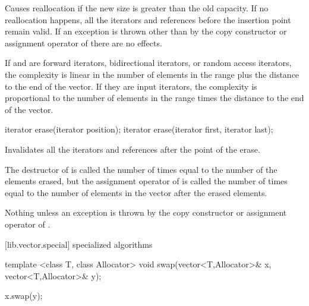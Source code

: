 \begin{itemdescr}
\pnum
\notes
Causes reallocation if the new size is greater than the old capacity.
If no reallocation happens, all the iterators and references before the insertion point remain valid.
If an exception is thrown other than by
the copy constructor or assignment operator of
 there are no effects.

\pnum
\complexity
If  and  are forward iterators, bidirectional iterators,
or random access iterators,
the complexity is linear in the number of elements in the range
\tcode{[first, last)} plus the distance to the end of the vector.
If they are input iterators, the complexity is proportional to the number of
elements in the range
\tcode{[first, last)} times the distance to the end of the vector.
\end{itemdescr}

%
\begin{itemdecl}
iterator erase(iterator position);
iterator erase(iterator first, iterator last);
\end{itemdecl}

\begin{itemdescr}
\pnum
\effects
Invalidates all the iterators and references after the point of the erase.

\pnum
\complexity
The destructor of  is called the number of times equal to the
number of the elements erased, but the assignment operator
of  is called the number of times equal to the number of
elements in the vector after the erased elements.

\pnum
\throws
Nothing unless an exception is thrown by the
copy constructor or assignment operator of
.
\end{itemdescr}

[lib.vector.special]{ specialized algorithms}

%
%
\begin{itemdecl}
template <class T, class Allocator>
  void swap(vector<T,Allocator>& x, vector<T,Allocator>& y);
\end{itemdecl}

\begin{itemdescr}
\pnum
\effects
\begin{codeblock}
    x.swap(y);
\end{codeblock}
\end{itemdescr}

